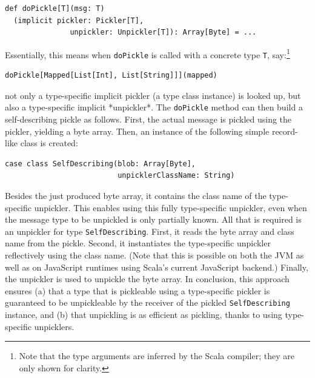 \documentclass[10pt]{sigplanconf}
\theoremstyle{definition}
\theoremstyle{definition}
\begin{document}
\begin{lstlisting}
def doPickle[T](msg: T)
  (implicit pickler: Pickler[T],
               unpickler: Unpickler[T]): Array[Byte] = ...
\end{lstlisting}

Essentially, this means when \verb|doPickle| is called with a concrete type \verb|T|, say:\footnote{Note that the type arguments are inferred by the Scala compiler; they are only shown for clarity.}

\begin{lstlisting}
doPickle[Mapped[List[Int], List[String]]](mapped)
\end{lstlisting}

\noindent not only a type-specific implicit pickler (a type class instance) is
looked up, but also a type-specific implicit *unpickler*. The \verb|doPickle|
method can then build a self-describing pickle as follows. First, the actual
message is pickled using the pickler, yielding a byte array. Then, an instance
of the following simple record-like class is created:

\begin{lstlisting}
case class SelfDescribing(blob: Array[Byte],
                          unpicklerClassName: String)
\end{lstlisting}

Besides the just produced byte array, it contains the class name of the
type-specific unpickler. This enables using this fully type-specific unpickler,
even when the message type to be unpickled is only partially known. All that is
required is an unpickler for type \verb|SelfDescribing|. First, it reads the
byte array and class name from the pickle. Second, it instantiates the
type-specific unpickler reflectively using the class name. (Note that this is
possible on both the JVM as well as on JavaScript runtimes using Scala's current
JavaScript backend.) Finally, the unpickler is used to unpickle the byte array.
In conclusion, this approach ensures (a) that a type that is pickleable using a
type-specific pickler is guaranteed to be unpickleable by the receiver of the
pickled \verb|SelfDescribing| instance, and (b) that unpickling is as efficient
as pickling, thanks to using type-specific unpicklers.

\end{document}
